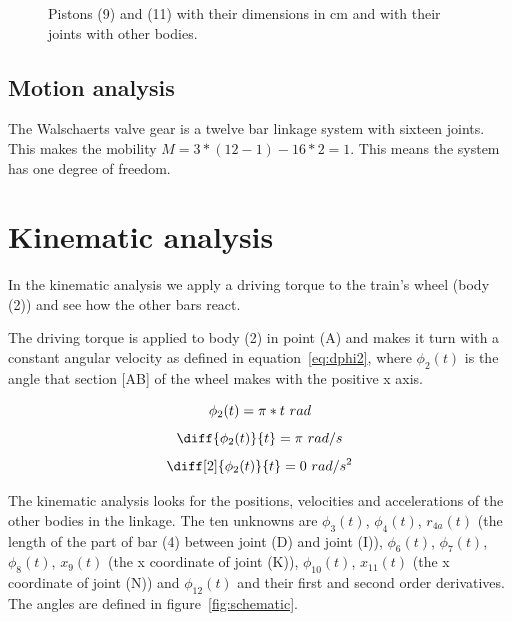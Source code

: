 \documentclass[a4paper]{article}
\begin{document}
\begin{figure}[b]
	\caption{Pistons (9) and (11) with their dimensions in cm and with their joints with other bodies.}
	\label{fig:pistons}
	
\end{figure}



\subsection{Motion analysis}

The Walschaerts valve gear is a twelve bar linkage system with sixteen joints. This makes the mobility \(M=3*(12-1)-16*2=1\). This means the system has one degree of freedom.


\section{Kinematic analysis}
\label{sec:kin}

In the kinematic analysis we apply a driving torque to the train's wheel (body (2)) and see how the other bars react. 

The driving torque is applied to body (2) in point (A) and makes it turn with a constant angular velocity as defined in equation~\ref{eq:dphi2}, where \(\phi_2(t)\) is the angle that section [AB] of the wheel makes with the positive x axis.

\begin{equation}
	\phi_2(t) = \pi*t~rad \\
	\label{eq:phi2}
\end{equation}
\begin{equation}
	\diff{\phi_2(t)}{t} = \pi~rad/s \\
	\label{eq:dphi2}
\end{equation}
\begin{equation}
	\diff[2]{\phi_2(t)}{t} = 0~rad/s^2\\
\end{equation}

The kinematic analysis looks for the positions, velocities and accelerations of the other bodies in the linkage. The ten unknowns are \(\phi_3(t)\), \(\phi_4(t)\), \(r_{4a}(t)\) (the length of the part of bar (4) between joint (D) and joint (I)), \(\phi_6(t)\), \(\phi_7(t)\), \(\phi_8(t)\), \(x_9(t)\) (the x coordinate of joint (K)), \(\phi_{10}(t)\), \(x_{11}(t)\) (the x coordinate of joint (N)) and \(\phi_{12}(t)\) and their first and second order derivatives. The angles are defined in figure~\ref{fig:schematic}.
\end{document}
